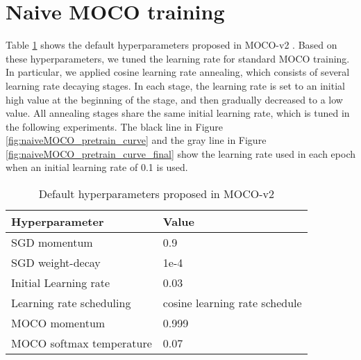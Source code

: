 \documentclass[12pt,twoside]{report}
\begin{document}


\section{Naive MOCO training} \label{sec:naiveMOCO_eval}
Table \ref{tab:naive_moco_hyperparameters} shows the default hyperparameters proposed in MOCO-v2 \cite{mocov2}. Based on these hyperparameters, we tuned the learning rate for standard MOCO training. In particular, we applied cosine learning rate annealing, which consists of several learning rate decaying stages. In each stage, the learning rate is set to an initial high value at the beginning of the stage, and then gradually decreased to a low value. All annealing stages share the same initial learning rate, which is tuned in the following experiments. The black line in Figure \ref{fig:naiveMOCO_pretrain_curve} and the gray line in Figure \ref{fig:naiveMOCO_pretrain_curve_final} show the learning rate used in each epoch when an initial learning rate of 0.1 is used. \\

\begin{table}[]
    \centering
    \begin{tabular}{ll}
    \toprule
    Hyperparameter & Value \\
    \midrule
    SGD momentum & 0.9 \\
    SGD weight-decay & 1e-4 \\
    Initial Learning rate & 0.03 \\
    Learning rate scheduling & cosine learning rate schedule \\
    MOCO momentum & 0.999 \\
    MOCO softmax temperature & 0.07 \\
    \bottomrule
    \end{tabular}
    \caption{Default hyperparameters proposed in MOCO-v2}
    \label{tab:naive_moco_hyperparameters}
\end{table}
\end{document}
